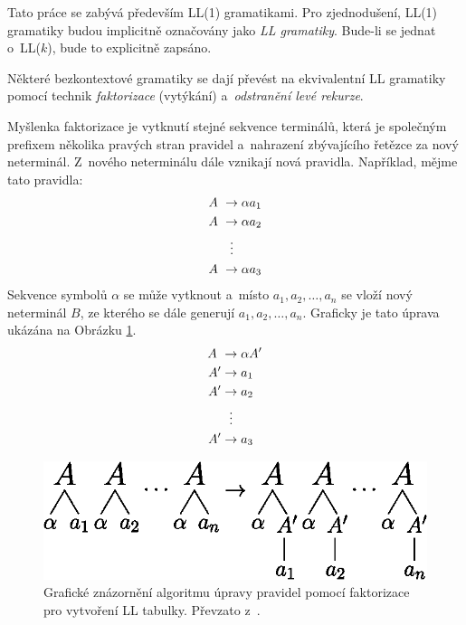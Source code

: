 \begin{convention}
    Tato práce se zabývá především LL(1) gramatikami.
    Pro zjednodušení, LL(1) gramatiky budou implicitně označovány jako \emph{LL gramatiky}.
    Bude-li se jednat o~LL($k$), bude to explicitně zapsáno.
\end{convention}

Některé bezkontextové gramatiky se dají převést na ekvivalentní LL gramatiky pomocí technik \emph{faktorizace} (vytýkání) a~\emph{odstranění levé rekurze}.

Myšlenka faktorizace je vytknutí stejné sekvence terminálů, která je společným prefixem několika pravých stran pravidel a~nahrazení zbývajícího řetězce za nový neterminál.
Z~nového neterminálu dále vznikají nová pravidla.
Například, mějme tato pravidla:
\begin{align*}
    A~&\rightarrow \alpha a_1\\
    A~&\rightarrow \alpha a_2\\
      &\vdotswithin{\rightarrow} \\
    A~&\rightarrow \alpha a_3
\end{align*}
Sekvence symbolů $\alpha$ se může vytknout a~místo $a_1, a_2, \ldots, a_n$ se vloží nový neterminál $B$, ze kterého se dále generují $a_1, a_2, \ldots, a_n$.
Graficky je tato úprava ukázána na Obrázku \ref{fig_faktorizace}.
\begin{align*}
    A~&\rightarrow \alpha A'\\
    A' &\rightarrow a_1\\
    A' &\rightarrow a_2\\
       &\vdotswithin{\rightarrow}\\
    A' &\rightarrow a_3
\end{align*}

\begin{figure}
    \centering
    \includegraphics{obrazky-figures/faktorizace.eps}
    \caption{Grafické znázornění algoritmu úpravy pravidel pomocí faktorizace pro vytvoření LL tabulky. Převzato z~\cite{meduna2017sa-shora-dolu}.}
    \label{fig_faktorizace}
\end{figure}

